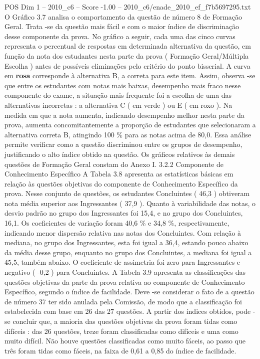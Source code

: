 \begin{textsample}{POS Dim 1 – 2010\_c6 – Score -1.00 – 2010\_c6/enade\_2010\_ef\_f7b5697295.txt}
O Gráfico 3.7 analisa o comportamento da questão de número 8 de Formação Geral.
Trata -se da questão mais fácil e com o maior índice de discriminação desse componente da prova.
No gráfico a seguir, cada uma das cinco curvas representa o percentual de respostas em determinada alternativa da questão, em função da nota dos estudantes nesta parte da prova ( Formação Geral/Múltipla Escolha ) antes de possíveis eliminações pelo critério do ponto bisserial.
A curva em \textbf{rosa} corresponde à alternativa B, a correta para este item.
Assim, observa -se que entre os estudantes com notas mais baixas, desempenho mais fraco nesse componente do exame, a situação mais frequente foi a escolha de uma das alternativas incorretas : a alternativa C ( em verde ) ou E ( em roxo ).
Na medida em que a nota aumenta, indicando desempenho melhor nesta parte da prova, aumenta concomitantemente a proporção de estudantes que selecionaram a alternativa correta B, atingindo 100 \% para as notas acima de 80,0.
Essa análise permite verificar como a questão discriminou entre os grupos de desempenho, justificando o alto índice obtido na questão.
Os gráficos relativos às demais questões de Formação Geral constam do Anexo I. 3.2.2 Componente de Conhecimento Específico A Tabela 3.8 apresenta as estatísticas básicas em relação às questões objetivas do componente de Conhecimento Específico da prova.
Nesse conjunto de questões, os estudantes Concluintes ( 46,3 ) obtiveram nota média superior aos Ingressantes ( 37,9 ).
Quanto à variabilidade das notas, o desvio padrão no grupo dos Ingressantes foi 15,4, e no grupo dos Concluintes, 16,1.
Os coeficientes de variação foram 40,6 \% e 34,8 \%, respectivamente, indicando menor dispersão relativa nas notas dos Concluintes.
Com relação à mediana, no grupo dos Ingressantes, esta foi igual a 36,4, estando pouco abaixo da média desse grupo, enquanto no grupo dos Concluintes, a mediana foi igual a 45,5, também abaixo.
O coeficiente de assimetria foi zero para Ingressantes e negativo ( -0,2 ) para Concluintes.
A Tabela 3.9 apresenta as classificações das questões objetivas da parte da prova relativa ao componente de Conhecimento Específico, segundo o índice de facilidade.
Deve -se considerar o fato de a questão de número 37 ter sido anulada pela Comissão, de modo que a classificação foi estabelecida com base em 26 das 27 questões.
A partir dos índices obtidos, pode -se concluir que, a maioria das questões objetivas da prova foram tidas como difíceis : das 26 questões, treze foram classificadas como difíceis e uma como muito difícil.
Não houve questões classificadas como muito fáceis, ao passo que três foram tidas como fáceis, na faixa de 0,61 a 0,85 do índice de facilidade.

\end{textsample}
